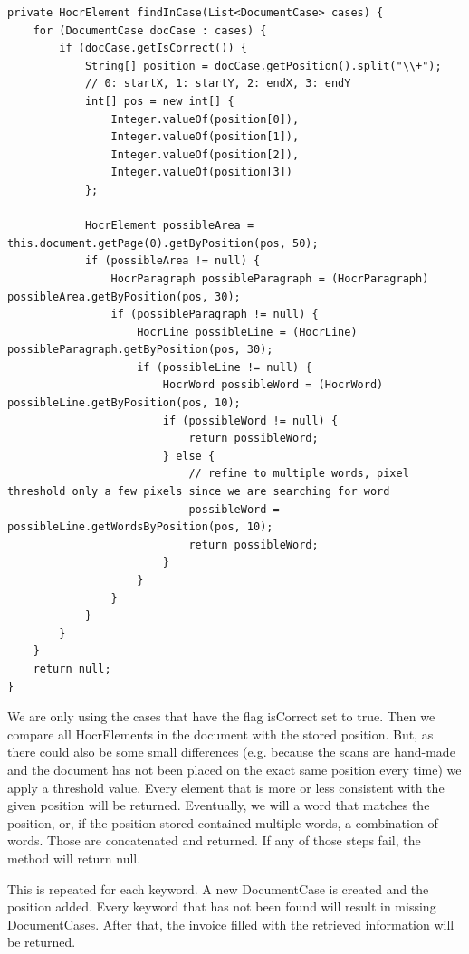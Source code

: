 \begin{lstlisting}[caption={Search for information in the DocumentCase}]
private HocrElement findInCase(List<DocumentCase> cases) {
    for (DocumentCase docCase : cases) {
        if (docCase.getIsCorrect()) {
            String[] position = docCase.getPosition().split("\\+");
            // 0: startX, 1: startY, 2: endX, 3: endY
            int[] pos = new int[] {
				Integer.valueOf(position[0]), 
				Integer.valueOf(position[1]), 
				Integer.valueOf(position[2]), 
				Integer.valueOf(position[3])
			};

            HocrElement possibleArea = this.document.getPage(0).getByPosition(pos, 50);
            if (possibleArea != null) {
                HocrParagraph possibleParagraph = (HocrParagraph)  possibleArea.getByPosition(pos, 30);
                if (possibleParagraph != null) {
                    HocrLine possibleLine = (HocrLine) possibleParagraph.getByPosition(pos, 30);
                    if (possibleLine != null) {
                        HocrWord possibleWord = (HocrWord) possibleLine.getByPosition(pos, 10);
                        if (possibleWord != null) {
                            return possibleWord;
                        } else {
                            // refine to multiple words, pixel threshold only a few pixels since we are searching for word
                            possibleWord = possibleLine.getWordsByPosition(pos, 10);
                            return possibleWord;
                        }
                    }
                }
            }
        }
    }
    return null;
}
\end{lstlisting}

We are only using the cases that have the flag isCorrect set to true. Then we compare all HocrElements in the document with the stored position. But, as there could also be some small differences (e.g. because the scans are hand-made and the document has not been placed on the exact same position every time) we apply a threshold value. Every element that is more or less consistent with the given position will be returned. Eventually, we will a word that matches the position, or, if the position stored contained multiple words, a combination of words. Those are concatenated and returned. If any of those steps fail, the method will return null.

This is repeated for each keyword. A new DocumentCase is created and the position added. Every keyword that has not been found will result in missing DocumentCases. After that, the invoice filled with the retrieved information will be returned.

